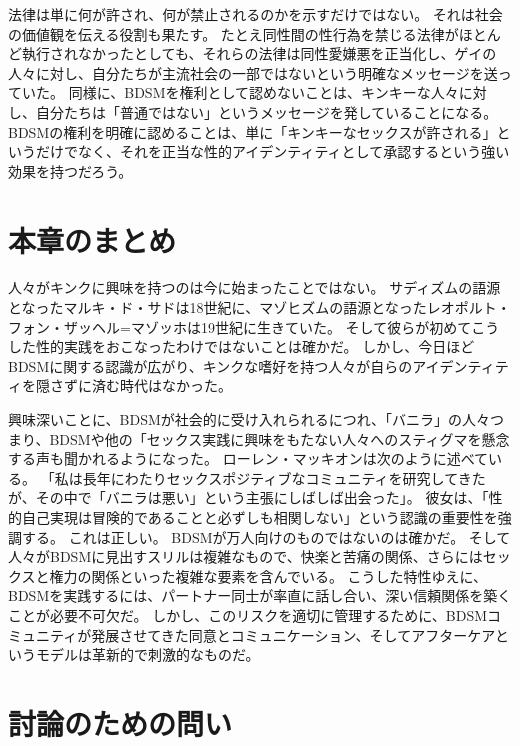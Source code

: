 \documentclass[paper=a4,book,openany]{jlreq} \usepackage{mystyle}
\begin{document}
法律は単に何が許され、何が禁止されるのかを示すだけではない。
それは社会の価値観を伝える役割も果たす。
たとえ同性間の性行為を禁じる法律がほとんど執行されなかったとしても、それらの法律は同性愛嫌悪を正当化し、ゲイの人々に対し、自分たちが主流社会の一部ではないという明確なメッセージを送っていた。
同様に、BDSMを権利として認めないことは、キンキーな人々に対し、自分たちは「普通ではない」というメッセージを発していることになる。
BDSMの権利を明確に認めることは、単に「キンキーなセックスが許される」というだけでなく、それを正当な性的アイデンティティとして承認するという強い効果を持つだろう。

\section{本章のまとめ}

人々がキンクに興味を持つのは今に始まったことではない。
サディズムの語源となったマルキ・ド・サドは18世紀に、マゾヒズムの語源となったレオポルト・フォン・ザッヘル=マゾッホは19世紀に生きていた。
そして彼らが初めてこうした性的実践をおこなったわけではないことは確かだ。
しかし、今日ほどBDSMに関する認識が広がり、キンクな嗜好を持つ人々が自らのアイデンティティを隠さずに済む時代はなかった。

興味深いことに、BDSMが社会的に受け入れられるにつれ、「バニラ」の人々{\DDASH}つまり、BDSMや他の「セックス実践に興味をもたない人々{\DDASH}へのスティグマを懸念する声も聞かれるようになった。
ローレン・マッキオンは次のように述べている。
「私は長年にわたりセックスポジティブなコミュニティを研究してきたが、その中で「バニラは悪い」という主張にしばしば出会った」。
彼女は、「性的自己実現は冒険的であることと必ずしも相関しない」という認識の重要性を強調する\citep{mckeon17:_when_it_comes}。
これは正しい。
BDSMが万人向けのものではないのは確かだ。
そして人々がBDSMに見出すスリルは複雑なもので、快楽と苦痛の関係、さらにはセックスと権力の関係といった複雑な要素を含んでいる。
こうした特性ゆえに、BDSMを実践するには、パートナー同士が率直に話し合い、深い信頼関係を築くことが必要不可欠だ。
しかし、このリスクを適切に管理するために、BDSMコミュニティが発展させてきた同意とコミュニケーション、そしてアフターケアというモデルは革新的で刺激的なものだ。

\section{討論のための問い}
\end{document}
